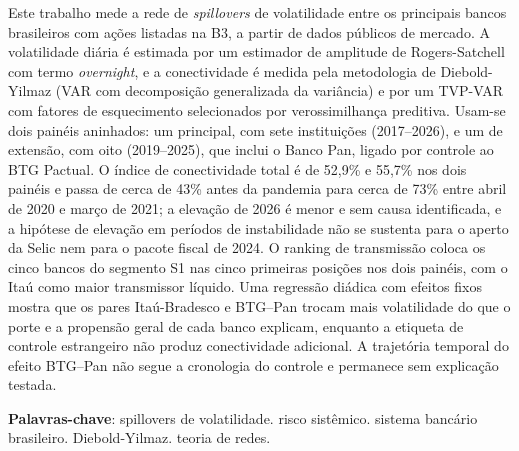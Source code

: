 \documentclass[12pt, a4paper, oneside, english, brazil]{abntex2}
\begin{document}
\frenchspacing

\pretextual

\imprimircapa

\imprimirfolhaderosto

\begin{resumo}
Este trabalho mede a rede de \textit{spillovers} de volatilidade entre os principais bancos
brasileiros com ações listadas na B3, a partir de dados públicos de mercado. A volatilidade
diária é estimada por um estimador de amplitude de Rogers-Satchell com termo
\textit{overnight}, e a conectividade é medida pela metodologia de Diebold-Yilmaz (VAR com
decomposição generalizada da variância) e por um TVP-VAR com fatores de esquecimento
selecionados por verossimilhança preditiva. Usam-se dois painéis aninhados: um principal, com
sete instituições (2017--2026), e um de extensão, com oito (2019--2025), que inclui o Banco
Pan, ligado por controle ao BTG Pactual. O índice de conectividade total é de 52,9\% e 55,7\%
nos dois painéis e passa de cerca de 43\% antes da pandemia para cerca de 73\% entre abril de
2020 e março de 2021; a elevação de 2026 é menor e sem causa identificada, e a hipótese de
elevação em períodos de instabilidade não se sustenta para o aperto da Selic nem para o pacote
fiscal de 2024. O ranking de transmissão coloca os cinco bancos do segmento S1 nas cinco
primeiras posições nos dois painéis, com o Itaú como maior transmissor líquido. Uma regressão
diádica com efeitos fixos mostra que os pares Itaú-Bradesco e BTG--Pan trocam mais
volatilidade do que o porte e a propensão geral de cada banco explicam, enquanto a etiqueta de
controle estrangeiro não produz conectividade adicional. A trajetória temporal do efeito
BTG--Pan não segue a cronologia do controle e permanece sem explicação testada.

\vspace{\onelineskip}
\noindent
\textbf{Palavras-chave}: spillovers de volatilidade. risco sistêmico. sistema bancário
brasileiro. Diebold-Yilmaz. teoria de redes.
\end{resumo}
\end{document}
